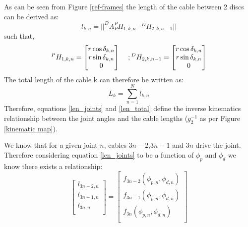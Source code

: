 \documentclass[a4paper,12pt]{report}
\begin{document}
As can be seen from Figure \ref{ref-frames} the length of the cable between 2 discs can be derived as:
\begin{equation}
\label{len_joints}
l_{k,n}= \lvert\lvert ^DA_P^PH_{1,k,n} - ^DH_{2,k,n-1}  \rvert\rvert
\end{equation}
such that,
\[
^PH_{1,k,n}=\begin{bmatrix}
r\cos{\delta_{k,n}}\\
r\sin{\delta_{k,n}}\\
0\\
\end{bmatrix} \hspace{4mm} ;\\
^DH_{2,k,n-1}=\begin{bmatrix}
r\cos{\delta_{k,n}}\\
r\sin{\delta_{k,n}}\\
0\\
\end{bmatrix} 
\]
The total length of the cable k can therefore be written as:
\begin{equation}
\label{len_total}
L_k= \sum_{n=1}^{N}l_{k,n}
\end{equation}
Therefore,  equations \ref{len_joints} and \ref{len_total} define the inverse kinematics relationship between the joint angles and the cable lengths ($g_{2}^{-1}$ as per Figure \ref{kinematic map}).

We know that for a given joint $n$, cables $3n-2$,$3n-1$ and $3n$ drive the joint. Therefore considering equation \ref{len_joints} to be a function of $\phi_p$ and $\phi_d$ we know there exists a relationship:
\begin{equation}
\begin{bmatrix}
l_{3n-2,n}\\
l_{3n-1,n}\\
l_{3n,n}\\
\end{bmatrix} =
\begin{bmatrix}
f_{3n-2}(\phi_{p,n},\phi_{d,n})\\
f_{3n-1}(\phi_{p,n},\phi_{d,n})\\
f_{3n}(\phi_{p,n},\phi_{d,n})\\
\end{bmatrix}
\label{function_of_l}
\end{equation}
\end{document}
